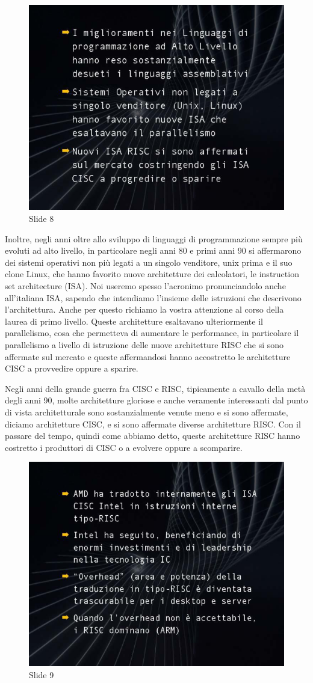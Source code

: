 \begin{figure}[ht]
    \centering
    \includegraphics[width=0.6\linewidth]{images/Lez01_p02_fig_02.png}
    \caption{Slide 8}
    \label{fig:slide_8}
\end{figure}


Inoltre, negli anni oltre allo sviluppo di linguaggi di programmazione sempre più evoluti ad alto livello, in particolare negli anni 80 e primi anni 90 si affermarono dei sistemi operativi non più legati a un singolo venditore, unix prima e il suo clone Linux, che hanno favorito nuove architetture dei calcolatori, le instruction set architecture (ISA).
Noi useremo spesso l'acronimo pronunciandolo anche all'italiana ISA, sapendo che intendiamo l'insieme delle istruzioni che descrivono l'architettura. 
Anche per questo richiamo la vostra attenzione al corso della laurea di primo livello.
Queste architetture esaltavano ulteriormente il parallelismo, cosa che permetteva di aumentare le performance, in particolare il parallelismo a livello di istruzione delle nuove architetture RISC che si sono affermate sul mercato e queste affermandosi hanno accostretto le architetture CISC a provvedire oppure a sparire.

Negli anni della grande guerra fra CISC e RISC, tipicamente a cavallo della metà degli anni 90, molte architetture gloriose e anche veramente interessanti dal punto di vista architetturale sono sostanzialmente venute meno e si sono affermate, diciamo architetture CISC, e si sono affermate diverse architetture RISC.
Con il passare del tempo, quindi come abbiamo detto, queste architetture RISC hanno costretto i produttori di CISC o a evolvere oppure a scomparire.

\begin{figure}[ht]
    \centering
    \includegraphics[width=0.6\linewidth]{images/Lez01_p02_fig_03.png}
    \caption{Slide 9}
    \label{fig:slide_9}
\end{figure}


